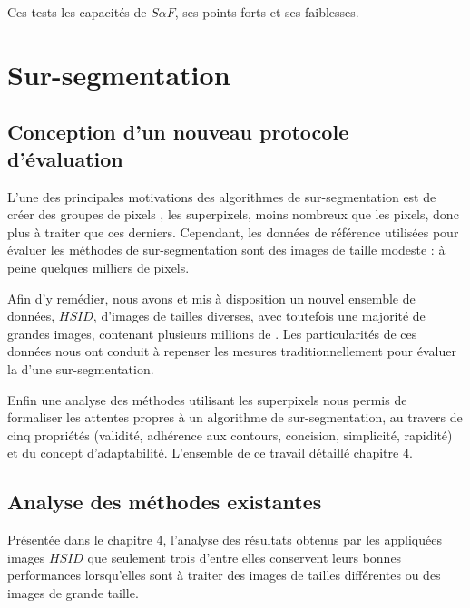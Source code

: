 Ces tests  les capacités de $S \alpha F$, ses points forts et ses faiblesses.


\section{Sur-segmentation}

\subsection{Conception d'un nouveau protocole d'évaluation}
L'une des principales motivations des algorithmes de sur-segmentation est de créer des groupes de pixels , les superpixels, moins nombreux que les pixels, donc plus  à traiter que ces derniers. Cependant, les données de référence utilisées pour évaluer les méthodes de sur-segmentation sont des images de taille modeste : à peine quelques milliers de pixels. 

Afin d'y remédier, nous avons  et mis à disposition un nouvel ensemble de données, $HSID$,  d'images de tailles diverses, avec toutefois une majorité de grandes images, contenant plusieurs millions de . Les particularités de ces données nous ont conduit à repenser les mesures traditionnellement  pour évaluer la  d'une sur-segmentation. 

Enfin\modif{,} une analyse des méthodes utilisant les superpixels nous  permis de formaliser les attentes propres à un algorithme de sur-segmentation, au travers de cinq propriétés (validité, adhérence aux contours, concision, simplicité, rapidité) et du concept d'adaptabilité. L'ensemble de ce travail  détaillé  chapitre 4.

\subsection{Analyse des méthodes existantes}

Présentée dans le chapitre 4, l'analyse des résultats obtenus par les  appliquées  images  $HSID$  que seulement trois d'entre elles conservent leurs bonnes performances lorsqu'elles sont  à traiter des images de tailles différentes ou des images de grande taille. 

